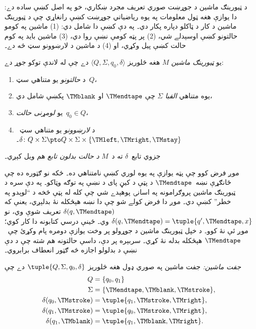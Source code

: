 \documentclass[../../../include/open-logic-section]{subfiles}
\begin{document}

\begin{explain}
د ټيورينګ ماشين د جوړښت صوري تعريف مجرد ښکاري، خو په اصل کښې ساده
دے: دا يوازې هغه ټول معلومات په يوه رياضياتي جوړښت کښې رانغاړي چې د
ټيورينګ ماشين د کار د ټاکلو دپاره پکار دي۔ په دې کښې دا شامل دي: (1)
ماشين په کومو حالتونو کښې اوسېدلے شي، (2) پر پټه کومې نښې روا دي، (3)
ماشين بايد په کوم حالت کښې پيل وکړي، او (4) د ماشين د لارښوونو سټ څه
دے۔
\end{explain}

\begin{defn}
يو \emph{ټيورينګ ماشين} $M$ هغه څلور‌يز $\langle Q, \Sigma, q_0,
\delta\rangle$ دے چې له لاندې توکو جوړ دے:
\begin{enumerate}
\item د \emph{حالتونو} يو متناهي سټ~$Q$،
\item يوه متناهي \emph{الفبا} $\Sigma$ چې $\TMendtape$ او
  $\TMblank$ پکښې شامل دي،
\item يو \emph{لومړنی حالت}~$q_0 \in Q$،
\item د \emph{لارښوونو} يو متناهي سټ~$\delta\colon Q \times \Sigma
  \pto Q \times \Sigma \times \{\TMleft, \TMright, \TMstay\}$۔
\end{enumerate}
جزوي تابع~$\delta$ ته د~$M$ \emph{د حالت بدلون تابع} هم ويل کېږي۔
\end{defn}

\begin{explain}
موږ فرض کوو چې پټه يوازې په يوه لوري کښې نامتناهي ده۔ ځکه نو ګټوره
ده چې ځانګړې نښه~$\TMendtape$ د پټې د کيڼ پای د نښې په توګه وټاکو۔
په دې سره د ټيورينګ ماشين پروګرامونه په اسانۍ پوهېدے شي چې کله له پټې
څخه د ``لوېدو په خطر'' کښې دي۔ موږ دا فرض کولے شو چې دا نښه هېڅکله
نۀ بدلېږي، يعنې که $\delta(q,\TMendtape)$ تعريف شوې وي، نو
$\delta(q,\TMendtape) = \tuple{q', \TMendtape, x}$ وي۔ ځينې درسي
کتابونه دا کار کوي؛ موږ ئې نۀ کوو۔ د خپل ټيورينګ ماشين د جوړولو پر
وخت يوازې دومره پام وکړئ چې~$\TMendtape$ هېڅکله بدله نۀ کړي۔ سربېره
پر دې، داسې حالتونه هم شته چې د دې نښې د بدلولو اجازه څه ګټور
انعطاف برابروي۔
\end{explain}

\begin{ex}
\emph{جفت ماشين:} جفت ماشين په صوري ډول هغه څلور‌يز
$\tuple{Q, \Sigma, q_0, \delta}$ دے چې
\begin{align*}
Q & = \{ q_0, q_1 \} \\
\Sigma & = \{ \TMendtape, \TMblank, \TMstroke \}, \\
\delta(q_0, \TMstroke) & = \tuple{q_1, \TMstroke, \TMright},\\
\delta(q_1, \TMstroke) & = \tuple{q_0, \TMstroke, \TMright},\\
\delta(q_1, \TMblank)  & = \tuple{q_1, \TMblank, \TMright}.
\end{align*}
\end{ex}
\end{document}
